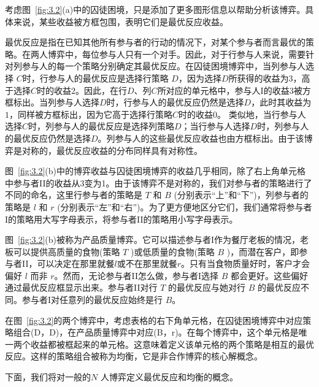 考虑图~\ref{fig:3.2}(a)中的囚徒困境，只是添加了更多图形信息以帮助分析该博弈。具体来说，某些收益被方框包围，表明它们是最优反应收益。

最优反应是指在已知其他所有参与者的行动的情况下，对某个参与者而言最优的策略。在两人博弈中，每位参与人只有一个对手。因此，对于行参与人来说，需要针对列参与人的每一个策略分别确定其最优反应。在囚徒困境博弈中，当列参与人选择 \(C\)时，行参与人的最优反应是选择行策略 \(D\)，因为选择\(D\)所获得的收益为$3$，高于选择\(C\)时的收益$2$。因此，在行\(D\)、列\(C\)所对应的单元格中，参与人I的收益$3$被方框标出。当列参与人选择\(D\)时，行参与人的最优反应仍然是选择\(D\)，此时其收益为$1$，同样被方框标出，因为它高于选择行策略\(C\)时的收益$0$。
类似地，当行参与人选择\(C\)时，列参与人的最优反应是选择列策略\(D\)；当行参与人选择\(D\)时，列参与人的最优反应仍然是选择\(D\)。列参与人的这些最优反应收益也由方框标出。由于该博弈是对称的，最优反应收益的分布同样具有对称性。

图~\ref{fig:3.2}(b)中的博弈收益与囚徒困境博弈的收益几乎相同，除了右上角单元格中参与者II的收益从3变为1。由于该博弈不是对称的，我们对参与者的策略进行了不同的命名，这里行参与者的策略是 \(T\) 和 \(B\) (分别表示“上”和“下”)，列参与者的策略是 \(l\) 和 \(r\) (分别表示“左”和“右”)。为了更方便地区分它们，我们通常将参与者I的策略用大写字母表示，将参与者II的策略用小写字母表示。


图~\ref{fig:3.2}(b)被称为产品质量博弈。它可以描述参与者I作为餐厅老板的情况，老板可以提供高质量的食物(策略 \(T\) )或低质量的食物(策略 \(B\) )，而潜在客户，即参与者II，可以决定在那里就餐\(l\)或不在那里就餐\(r\)。只有当食物质量好时，客户才会偏好 \(l\) 而非 \(r\)。然而，无论参与者II怎么做，参与者I选择 \(B\) 都会更好。这些偏好通过最优反应框显示出来。参与者II对行 \(T\) 的最优反应与她对行 \(B\) 的最优反应不同。参与者I对任意列的最优反应始终是行 \(B\)。

在图~\ref{fig:3.2}的两个博弈中，考虑表格的右下角单元格，在囚徒困境博弈中对应策略组合(D，D)，在产品质量博弈中对应(B，r)。在每个博弈中，这个单元格是唯一两个收益都被框起来的单元格。这意味着定义该单元格的两个策略是相互的最优反应。这样的策略组合被称为均衡，它是非合作博弈的核心解概念。

下面，我们将对一般的\(N\) 人博弈定义最优反应和均衡的概念。

